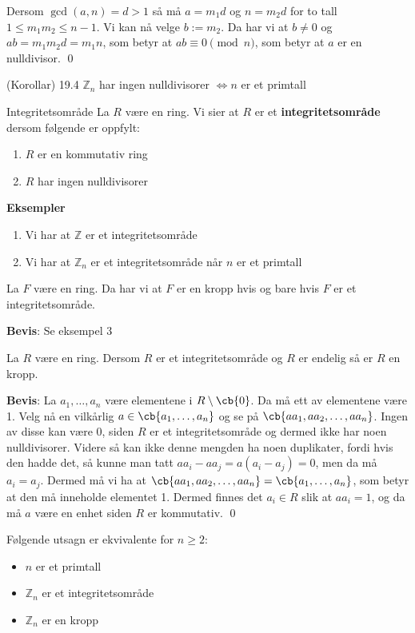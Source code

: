 Dersom $\gcd(a, n) = d > 1$ så må $a = m_1d$ og $n = m_2d$ for to tall $1 \leq m_1m_2\leq n-1$.
Vi kan nå velge $b:= m_2$. Da har vi at $b \neq 0$ og $ab=m_1m_2d=m_1n$, som betyr at 
$ab\equiv 0 \pmod{n}$, som betyr at $a$ er en nulldivisor. \qed

\begin{theorem*}{(Korollar) 19.4}{}
  $\mathbb{Z}_n$ har ingen nulldivisorer $\iff n$ er et primtall 
\end{theorem*}

\begin{definition}{Integritetsområde}{}
  La $R$ være en ring. Vi sier at $R$ er et \textbf{integritetsområde} dersom følgende er oppfylt:
  \begin{enumerate}
    \item $R$ er en kommutativ ring
    \item $R$ har ingen nulldivisorer
  \end{enumerate}
\end{definition}

\textbf{Eksempler}
\begin{enumerate}
  \item Vi har at $\mathbb{Z}$ er et integritetsområde
  \item Vi har at $\mathbb{Z}_n$ er et integritetsområde når $n$ er et primtall
\end{enumerate}

\begin{theorem*}{19.9}{}
  La $F$ være en ring. Da har vi at $F$ er en kropp hvis og bare hvis $F$ er et integritetsområde. 
\end{theorem*}
\textbf{Bevis}: Se eksempel 3

\begin{theorem*}{19.11}{}
  La $R$ være en ring. Dersom $R$ er et integritetsområde og $R$ er endelig så er $R$ en kropp. 
\end{theorem*}

\textbf{Bevis}: La $a_1, \dots, a_n$ være elementene i $R\setminus \cb{0}$. Da må ett av elementene
være 1. Velg nå en vilkårlig $a \in \cb{a_1, \dots, a_n}$ og se på 
$\cb{aa_1, aa_2, \dots, aa_n}$. Ingen av disse kan være 0, siden $R$ er et integritetsområde og
dermed ikke har noen nulldivisorer. Videre så kan ikke denne mengden ha noen duplikater, fordi
hvis den hadde det, så kunne man tatt $aa_i - aa_j = a(a_i - a_j) = 0$, men da må $a_i = a_j$. 
Dermed må vi ha at $\cb{aa_1, aa_2, \dots, aa_n} = \cb{a_1, \dots, a_n}$, som betyr at
den må inneholde elementet 1. Dermed finnes det $a_i\in R$ slik at $aa_i = 1$, og da må
$a$ være en enhet siden $R$ er kommutativ. \qed

\begin{theorem*}{19.12}{}
  Følgende utsagn er ekvivalente for $n \geq 2$: 
  \begin{itemize}
    \item $n$ er et primtall
    \item $\mathbb{Z}_n$ er et integritetsområde
    \item $\mathbb{Z}_n$ er en kropp
  \end{itemize}
\end{theorem*}

